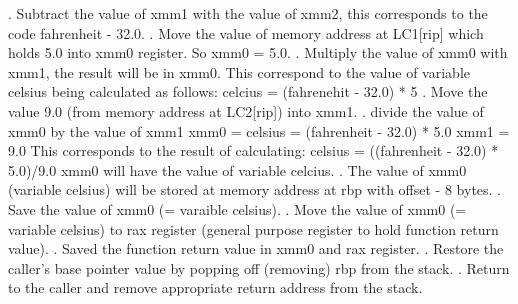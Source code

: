 \documentclass{article}
\theoremstyle{theorem}
\theoremstyle{definition}
\theoremstyle{remark}
\begin{document}
\newline {}. Subtract the value of xmm1 with the value of xmm2, this corresponds to the code fahrenheit - 32.0.
\newline {}. Move the value of memory address at LC1[rip] which holds 5.0 into xmm0 register. So xmm0 = 5.0.
\newline {}. Multiply the value of xmm0 with xmm1, the result will be in xmm0. This correspond to the value of variable celsius being calculated as follows:
celcius = (fahrenehit - 32.0) * 5 
\newline {}. Move the value 9.0 (from memory address at LC2[rip]) into xmm1.
\newline {}. divide the value of xmm0 by the value of xmm1 
\newline \indent \indent xmm0 = celsius = (fahrenheit - 32.0) * 5.0
\newline \indent \indent xmm1 = 9.0
\newline This corresponds to the result of calculating: 
\newline \indent \indent celsius = ((fahrenheit - 32.0) * 5.0)/9.0
\newline  \indent xmm0 will have the value of variable celcius.
\newline {}. The value of xmm0 (variable celsius) will be stored at memory address at rbp with offset - 8 bytes.
\newline {}. Save the value of xmm0 (= varaible celsius).
\newline {}. Move the value of xmm0 (= variable celsius) to rax register (general purpose register to hold function return value).
\newline {}. Saved the function return value in xmm0 and rax register.
\newline {}. Restore the caller's base pointer value by popping off (removing) rbp from the stack.
\newline {}. Return to the caller and remove appropriate return address from the stack.
\end{document}

